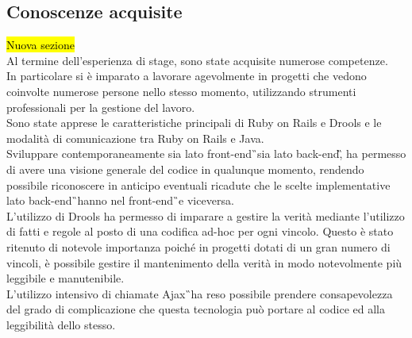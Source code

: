 \subsection{Conoscenze acquisite}
\hl{Nuova sezione}\\
	Al termine dell'esperienza di stage, sono state acquisite numerose competenze.\\
	In particolare si è imparato a lavorare agevolmente in progetti che vedono coinvolte numerose persone nello stesso momento, utilizzando strumenti professionali per la gestione del lavoro.\\
	Sono state apprese le caratteristiche principali di Ruby on Rails e Drools e le modalità di comunicazione tra Ruby on Rails e Java.\\
	Sviluppare contemporaneamente sia lato \gls{front-end}\G\ sia lato \gls{back-end}\G,  ha permesso di avere una visione generale del codice in qualunque momento, rendendo possibile riconoscere in anticipo eventuali ricadute che le scelte implementative lato \gls{back-end}\G\ hanno nel \gls{front-end}\G\ e viceversa.\\
	L'utilizzo di Drools ha permesso di imparare a gestire la verità mediante l'utilizzo di fatti e regole al posto di una codifica ad-hoc per ogni vincolo. Questo è stato ritenuto di notevole importanza poiché in progetti dotati di un gran numero di vincoli, è possibile gestire il mantenimento della verità in modo notevolmente più leggibile e manutenibile.\\
	L'utilizzo intensivo di chiamate \gls{Ajax}\G\ ha reso possibile prendere consapevolezza del grado di complicazione che questa tecnologia può portare al codice ed alla leggibilità dello stesso.\\
	
